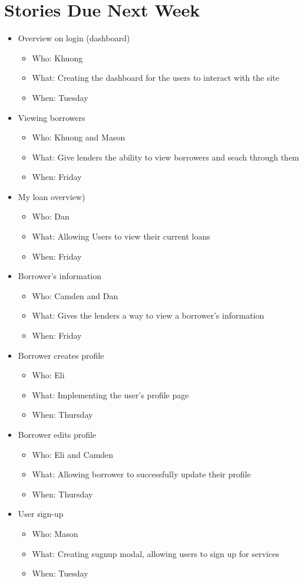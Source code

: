 
\section{Stories Due Next Week}
\begin{itemize}
	\item Overview on login (dashboard)
	\begin{itemize}
		\item Who: Khuong
		\item What: Creating the dashboard for the users to interact with the site
		\item When: Tuesday
	\end{itemize}

	\item Viewing borrowers
	\begin{itemize}
		\item Who: Khuong and Mason
		\item What: Give lenders the ability to view borrowers and seach through them
		\item When: Friday
	\end{itemize}

	\item My loan overview)
	\begin{itemize}
		\item Who: Dan
		\item What: Allowing Users to view their current loans
		\item When: Friday
	\end{itemize}

	\item Borrower's information
	\begin{itemize}
		\item Who: Camden and Dan
		\item What: Gives the lenders a way to view a borrower's information
		\item When: Friday
	\end{itemize}

	\item Borrower creates profile
	\begin{itemize}
		\item Who: Eli
		\item What: Implementing the user's profile page
		\item When: Thursday
	\end{itemize}

	\item Borrower edits profile
	\begin{itemize}
		\item Who: Eli and Camden
		\item What: Allowing borrower to successfully update their profile
		\item When: Thursday
	\end{itemize}

	\item User sign-up
	\begin{itemize}
		\item Who: Mason
		\item What: Creating sugnup modal, allowing users to sign up for services
		\item When: Tuesday
	\end{itemize}
\end{itemize}